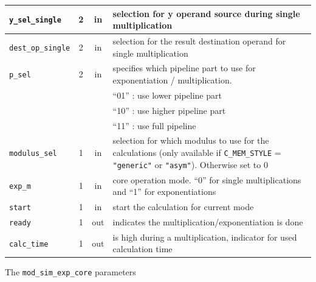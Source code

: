 \begin{tabular}{|l|c|c|p{8cm}|}
\hline
\verb|y_sel_single| & 2     & in    & selection for y operand source during single multiplication \bigstrut\\
\hline
\verb|dest_op_single| & 2     & in    & selection for the result destination operand for single multiplication \bigstrut\\
\hline
\verb|p_sel| & 2     & in    & specifies which pipeline part to use for exponentiation / multiplication. \bigstrut[t]\\
      &       &       & ``01'' : use lower pipeline part \\
      &       &       & ``10'' : use higher pipeline part \\
      &       &       & ``11'' : use full pipeline \bigstrut[b]\\
\hline
\verb|modulus_sel| & 1     & in    & selection for which modulus to use for the calculations (only available if \verb|C_MEM_STYLE| = \verb|"generic"| or \verb|"asym"|). Otherwise set to 0 \bigstrut\\
\hline
\verb|exp_m| & 1     & in    & core operation mode. ``0'' for single multiplications and ``1'' for exponentiations \bigstrut\\
\hline
\verb|start| & 1     & in    & start the calculation for current mode \bigstrut\\
\hline
\verb|ready| & 1     & out   & indicates the multiplication/exponentiation is done \bigstrut\\
\hline
\verb|calc_time| & 1     & out   & is high during a multiplication, indicator for used calculation time \bigstrut\\
\hline
\end{tabular}%
\newpage
The \verb|mod_sim_exp_core| parameters\\
